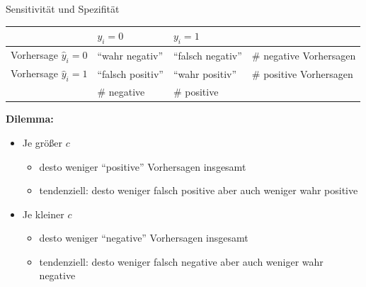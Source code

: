 \documentclass[
  10pt,
  ignorenonframetext,
]{beamer}
\providecommand{\tightlist}{%
  \setlength{\itemsep}{0pt}\setlength{\parskip}{0pt}}
\begin{document}
\begin{frame}{Sensitivität und Spezifität}
\label{sensitivituxe4t-und-spezifituxe4t-1}
\begin{small}
\begin{tabular}{l|ll|l}
& $y_i = 0$ & $y_i = 1$ & \\
\hline
Vorhersage $\hat y_i = 0$ &  ``wahr negativ'' &  ``falsch
negativ'' & \# negative Vorhersagen\\
Vorhersage $\hat y_i = 1$ &  ``falsch positiv'' &  ``wahr
positiv''& \# positive Vorhersagen\\
\hline
& \# negative & \# positive \\
\end{tabular}
\end{small}

\textbf{Dilemma:}

\begin{itemize}
\tightlist
\item
  Je größer \(c\)

  \begin{itemize}
  \tightlist
  \item
    desto weniger ``positive'' Vorhersagen insgesamt
  \item
    tendenziell: desto weniger falsch positive aber auch weniger wahr
    positive
  \end{itemize}
\item
  Je kleiner \(c\)

  \begin{itemize}
  \tightlist
  \item
    desto weniger ``negative'' Vorhersagen insgesamt
  \item
    tendenziell: desto weniger falsch negative aber auch weniger wahr
    negative
  \end{itemize}
\end{itemize}
\end{frame}
\end{document}
